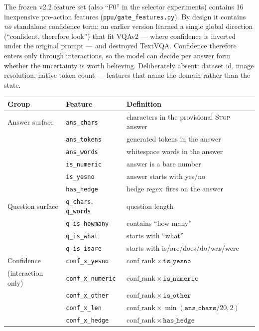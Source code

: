 \documentclass[10pt]{article}
\begin{document}
The frozen v2.2 feature set (also ``F0'' in the selector experiments)
contains 16 inexpensive pre-action features
(\texttt{ppu/gate\_features.py}). By design it contains \emph{no}
standalone confidence term: an earlier version learned a single global
direction (``confident, therefore look'') that fit VQAv2 --- where
confidence is inverted under the original prompt --- and destroyed TextVQA.
Confidence therefore enters only through interactions, so the model can
decide per answer form whether the uncertainty is worth believing.
Deliberately absent: dataset id, image resolution, native token count ---
features that name the domain rather than the state.

\begin{center}
\small
\begin{tabular}{lll}
\toprule
Group & Feature & Definition \\
\midrule
Answer surface & \texttt{ans\_chars} & characters in the provisional \textsc{Stop} answer \\
& \texttt{ans\_tokens} & generated tokens in the answer \\
& \texttt{ans\_words} & whitespace words in the answer \\
& \texttt{is\_numeric} & answer is a bare number \\
& \texttt{is\_yesno} & answer starts with yes/no \\
& \texttt{has\_hedge} & hedge regex\footnotemark\ fires on the answer \\
\midrule
Question surface & \texttt{q\_chars}, \texttt{q\_words} & question length \\
& \texttt{q\_is\_howmany} & contains ``how many'' \\
& \texttt{q\_is\_what} & starts with ``what'' \\
& \texttt{q\_is\_isare} & starts with is/are/does/do/was/were \\
\midrule
Confidence & \texttt{conf\_x\_yesno} & $\mathrm{conf\_rank}\times\texttt{is\_yesno}$ \\
(interaction only) & \texttt{conf\_x\_numeric} & $\mathrm{conf\_rank}\times\texttt{is\_numeric}$ \\
& \texttt{conf\_x\_other} & $\mathrm{conf\_rank}\times\texttt{is\_other}$ \\
& \texttt{conf\_x\_len} & $\mathrm{conf\_rank}\times\min(\texttt{ans\_chars}/20,2)$ \\
& \texttt{conf\_x\_hedge} & $\mathrm{conf\_rank}\times\texttt{has\_hedge}$ \\
\bottomrule
\end{tabular}
\end{center}
\end{document}
